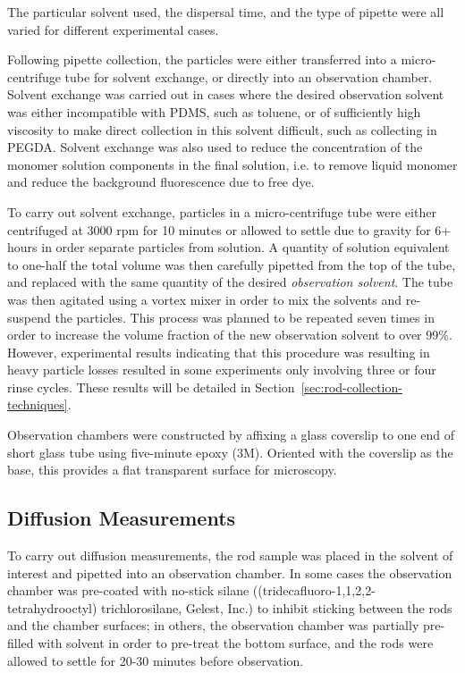 The particular solvent used, the dispersal time, and the type of pipette were all varied for different experimental
cases.

Following pipette collection, the particles were either transferred into a micro-centrifuge tube for solvent 
exchange, or directly into an observation chamber.  Solvent exchange was carried out in cases where the desired
observation solvent was either incompatible with PDMS, such as toluene, or of sufficiently high viscosity to make
direct collection in this solvent difficult, such as collecting in PEGDA.  Solvent exchange was also used to reduce
the concentration of the monomer solution components in the final solution, i.e. to remove liquid monomer and 
reduce the background fluorescence due to free dye.

To carry out solvent exchange, particles in a micro-centrifuge tube were either centrifuged at 3000 rpm for 10 minutes or
allowed to settle due to gravity for 6+ hours in order separate particles from solution.  A quantity of solution equivalent
to one-half the total volume was then carefully pipetted from the top of the tube, and replaced with the same quantity of 
the desired \textit{observation solvent}.  The tube was then agitated using a vortex mixer in order to mix the solvents and
re-suspend the particles.  This process was planned to be repeated seven times in order to increase the volume fraction of
the new observation solvent to over 99\%.  However, experimental results indicating that this procedure was resulting in heavy
particle losses resulted in some experiments only involving three or four rinse cycles.  These results will be detailed in 
Section~\ref{sec:rod-collection-techniques}.


Observation chambers were constructed by affixing a glass coverslip to one end of short glass tube using 
five-minute epoxy (3M).  Oriented with the coverslip as the base, this provides a flat transparent surface
for microscopy.


\subsection{Diffusion Measurements}

To carry out diffusion measurements, the rod sample was placed in the solvent of interest and pipetted into an observation 
chamber.  In some cases the observation chamber was pre-coated with no-stick silane ((tridecafluoro-1,1,2,2-tetrahydrooctyl) 
trichlorosilane, Gelest, Inc.) to inhibit sticking between the rods and the chamber surfaces; in others,
the observation chamber was partially pre-filled with solvent in order to pre-treat the 
bottom surface, and the rods were allowed to settle for 20-30 minutes before observation.

